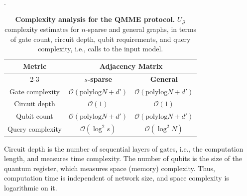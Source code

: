 \documentclass[
  reprint,
  superscriptaddress,
  amsmath,amssymb,
  aps,prl,
]{revtex4-2}
\begin{document}
\begin{table}[h] %
    \centering
    \normalsize
    \caption{\label{table:complexity}\textbf{Complexity analysis for the QMME protocol.} \(U_\mathcal G\) complexity estimates for \(n\)-sparse and general graphs, in terms of gate count, circuit depth, qubit requirements, and query complexity, i.e., calls to the input model.}.
    \label{tab:complexity}
    {\normalsize
    \begin{tabular}{|c|c|c|}
    \hline
    \multirow{2}{*}{\textbf{Metric}} & \multicolumn{2}{c|}{\textbf{Adjacency Matrix}} \\
    \cline{2-3}
     & \textbf{\(s\)-sparse} & \textbf{General} \\
    \hline
    Gate complexity & \(\mathcal O(\text{polylog} N + d')\) & \(\mathcal O(\text{polylog} N + d')\) \\
    \hline
    Circuit depth & \(\mathcal O(1)\) & \(\mathcal O(1)\) \\
    \hline
    Qubit count & \(\mathcal O(\text{polylog} N + d')\) & \(\mathcal O(\text{polylog} N + d')\) \\
    \hline
    Query complexity & \(\mathcal O(\log^2 s)\) & \(\mathcal O(\log^2 N)\) \\
    \hline
    \end{tabular}
    }
\end{table}
%
\noindent Circuit depth is the number of sequential layers of gates, i.e., the computation length, and measures time complexity. The number of qubits is the size of the quantum register, which measures space (memory) complexity. Thus, computation time is independent of network size, and space complexity is logarithmic on it.

\end{document}

